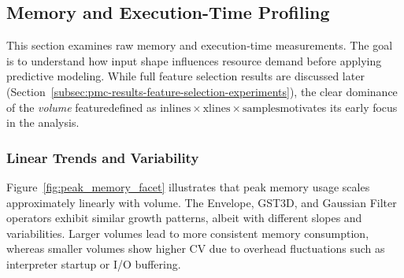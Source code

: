 \subsection{Memory and Execution-Time Profiling}
\label{subsec:pmc-results-memory-and-execution-time-profiling}

This section examines raw memory and execution-time measurements.
The goal is to understand how input shape influences resource demand before applying predictive modeling.
While full feature selection results are discussed later (Section~\ref{subsec:pmc-results-feature-selection-experiments}), the clear dominance of the \emph{volume} feature\textemdash defined as $\text{inlines} \times \text{xlines} \times \text{samples}$\textemdash motivates its early focus in the analysis.

\subsubsection{Linear Trends and Variability}
\label{subsec:linear-trends-and-variability}

Figure~\ref{fig:peak_memory_facet} illustrates that peak memory usage scales approximately linearly with volume.
The Envelope, \ac{GST3D}, and Gaussian Filter operators exhibit similar growth patterns, albeit with different slopes and variabilities.
Larger volumes lead to more consistent memory consumption, whereas smaller volumes show higher \ac{CV} due to overhead fluctuations such as interpreter startup or I/O buffering.

